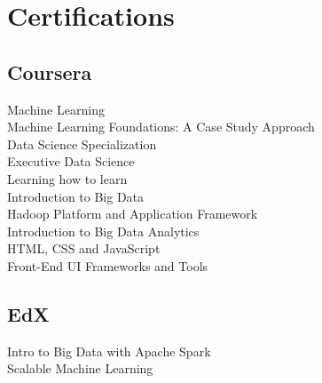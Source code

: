 \documentclass[]{deedy-resume-openfont}
\begin{document}
\begin{minipage}[t]{0.33\textwidth}
\footnotesize
\section{Certifications}
\subsection{Coursera}
Machine Learning \\
Machine Learning Foundations: A Case Study Approach \\
Data Science Specialization \\
Executive Data Science \\
Learning how to learn \\
Introduction to Big Data \\ 
Hadoop Platform and Application Framework \\ 
Introduction to Big Data Analytics \\
HTML, CSS and JavaScript \\ 
Front-End UI Frameworks and Tools
\sectionsep

\subsection{EdX}
Intro to Big Data with Apache Spark \\
Scalable Machine Learning
\sectionsep


\end{minipage}
\end{document}
